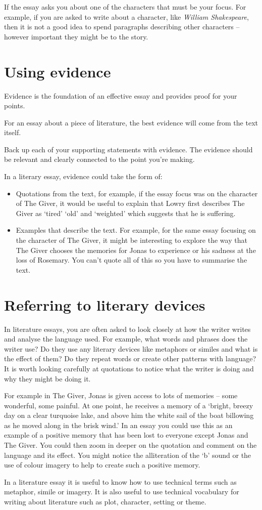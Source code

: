 	If the essay asks you about one of the characters that must be your focus. For example, if you are asked to write about a character, like \textit{William Shakespeare}, then it is not a good idea to spend paragraphs describing other characters – however important they might be to the story.

\section{Using evidence}
	Evidence is the foundation of an effective essay and provides proof for your points.
	
	For an essay about a piece of literature, the best evidence will come from the text itself.
	
	Back up each of your supporting statements with evidence. The evidence should be relevant and clearly connected to the point you’re making.
	
	In a literary essay, evidence could take the form of:
	\begin{itemize}
		\item Quotations from the text, for example, if the essay focus was on the character of The Giver, it would be useful to explain that Lowry first describes The Giver as ‘tired’ ‘old’ and ‘weighted’ which suggests that he is suffering.
		\item Examples that describe the text. For example, for the same essay focusing on the character of The Giver, it might be interesting to explore the way that The Giver chooses the memories for Jonas to experience or his sadness at the loss of Rosemary. You can't quote all of this so you have to summarise the text.
	\end{itemize}

\section{Referring to literary devices}
	In literature essays, you are often asked to look closely at how the writer writes and analyse the language used. For example, what words and phrases does the writer use? Do they use any literary devices like metaphors or similes and what is the effect of them? Do they repeat words or create other patterns with language? It is worth looking carefully at quotations to notice what the writer is doing and why they might be doing it.
	
	For example in The Giver, Jonas is given access to lots of memories – some wonderful, some painful. At one point, he receives a memory of a ‘bright, breezy day on a clear turquoise lake, and above him the white sail of the boat billowing as he moved along in the brisk wind.’ In an essay you could use this as an example of a positive memory that has been lost to everyone except Jonas and The Giver. You could then zoom in deeper on the quotation and comment on the language and its effect. You might notice the alliteration of the ‘b’ sound or the use of colour imagery to help to create such a positive memory.
	
	In a literature essay it is useful to know how to use technical terms such as metaphor, simile or imagery. It is also useful to use technical vocabulary for writing about literature such as plot, character, setting or theme.
